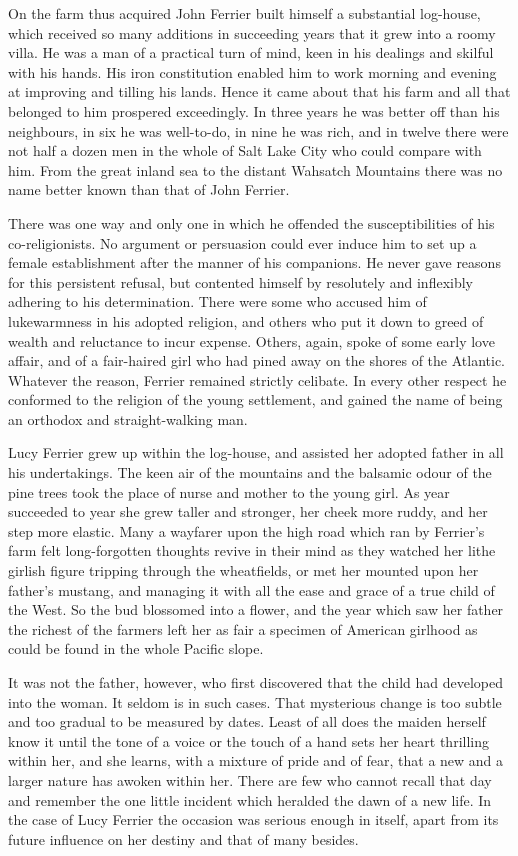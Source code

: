 On the farm thus acquired John Ferrier built himself a substantial log-house, which received so many additions in succeeding years that it grew into a roomy villa. He was a man of a practical turn of mind, keen in his dealings and skilful with his hands. His iron constitution enabled him to work morning and evening at improving and tilling his lands. Hence it came about that his farm and all that belonged to him prospered exceedingly. In three years he was better off than his neighbours, in six he was well-to-do, in nine he was rich, and in twelve there were not half a dozen men in the whole of Salt Lake City who could compare with him. From the great inland sea to the distant Wahsatch Mountains there was no name better known than that of John Ferrier.

There was one way and only one in which he offended the susceptibilities of his co-religionists. No argument or persuasion could ever induce him to set up a female establishment after the manner of his companions. He never gave reasons for this persistent refusal, but contented himself by resolutely and inflexibly adhering to his determination. There were some who accused him of lukewarmness in his adopted religion, and others who put it down to greed of wealth and reluctance to incur expense. Others, again, spoke of some early love affair, and of a fair-haired girl who had pined away on the shores of the Atlantic. Whatever the reason, Ferrier remained strictly celibate. In every other respect he conformed to the religion of the young settlement, and gained the name of being an orthodox and straight-walking man.

Lucy Ferrier grew up within the log-house, and assisted her adopted father in all his undertakings. The keen air of the mountains and the balsamic odour of the pine trees took the place of nurse and mother to the young girl. As year succeeded to year she grew taller and stronger, her cheek more ruddy, and her step more elastic. Many a wayfarer upon the high road which ran by Ferrier's farm felt long-forgotten thoughts revive in their mind as they watched her lithe girlish figure tripping through the wheatfields, or met her mounted upon her father's mustang, and managing it with all the ease and grace of a true child of the West. So the bud blossomed into a flower, and the year which saw her father the richest of the farmers left her as fair a specimen of American girlhood as could be found in the whole Pacific slope.

It was not the father, however, who first discovered that the child had developed into the woman. It seldom is in such cases. That mysterious change is too subtle and too gradual to be measured by dates. Least of all does the maiden herself know it until the tone of a voice or the touch of a hand sets her heart thrilling within her, and she learns, with a mixture of pride and of fear, that a new and a larger nature has awoken within her. There are few who cannot recall that day and remember the one little incident which heralded the dawn of a new life. In the case of Lucy Ferrier the occasion was serious enough in itself, apart from its future influence on her destiny and that of many besides.

